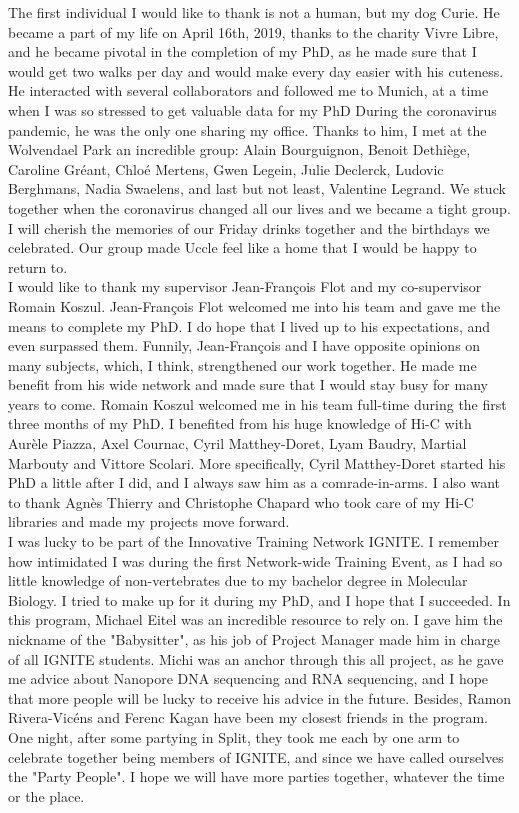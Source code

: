 
The first individual I would like to thank is not a human, but my dog Curie. He became a part of my life on April 16th, 2019, thanks to the charity Vivre Libre, and he became pivotal in the completion of my PhD, as he made sure that I would get two walks per day and would make every day easier with his cuteness. He interacted with several collaborators and followed me to Munich, at a time when I was so stressed to get valuable data for my PhD During the coronavirus pandemic, he was the only one sharing my office. Thanks to him, I met at the Wolvendael Park an incredible group: Alain Bourguignon, Benoit Dethiège, Caroline Gréant, Chloé Mertens, Gwen Legein, Julie Declerck, Ludovic Berghmans, Nadia Swaelens, and last but not least, Valentine Legrand. We stuck together when the coronavirus changed all our lives and we became a tight group. I will cherish the memories of our Friday drinks together and the birthdays we celebrated. Our group made Uccle feel like a home that I would be happy to return to.\\

I would like to thank my supervisor Jean-François Flot and my co-supervisor Romain Koszul. Jean-François Flot welcomed me into his team and gave me the means to complete my PhD. I do hope that I lived up to his expectations, and even surpassed them. Funnily, Jean-François and I have opposite opinions on many subjects, which, I think, strengthened our work together. He made me benefit from his wide network and made sure that I would stay busy for many years to come. Romain Koszul welcomed me in his team full-time during the first three months of my PhD. I benefited from his huge knowledge of Hi-C with Aurèle Piazza, Axel Cournac, Cyril Matthey-Doret, Lyam Baudry, Martial Marbouty and Vittore Scolari. More specifically, Cyril Matthey-Doret started his PhD a little after I did, and I always saw him as a comrade-in-arms. I also want to thank Agnès Thierry and Christophe Chapard who took care of my Hi-C libraries and made my projects move forward. \\

I was lucky to be part of the Innovative Training Network IGNITE. I remember how intimidated I was during the first Network-wide Training Event, as I had so little knowledge of non-vertebrates due to my bachelor degree in Molecular Biology. I tried to make up for it during my PhD, and I hope that I succeeded. In this program, Michael Eitel was an incredible resource to rely on. I gave him the nickname of the "Babysitter", as his job of Project Manager made him in charge of all IGNITE students. Michi was an anchor through this all project, as he gave me advice about Nanopore DNA sequencing and RNA sequencing, and I hope that more people will be lucky to receive his advice in the future. Besides, Ramon Rivera-Vicéns and Ferenc Kagan have been my closest friends in the program. One night, after some partying in Split, they took me each by one arm to celebrate together being members of IGNITE, and since we have called ourselves the "Party People". I hope we will have more parties together, whatever the time or the place. \\

